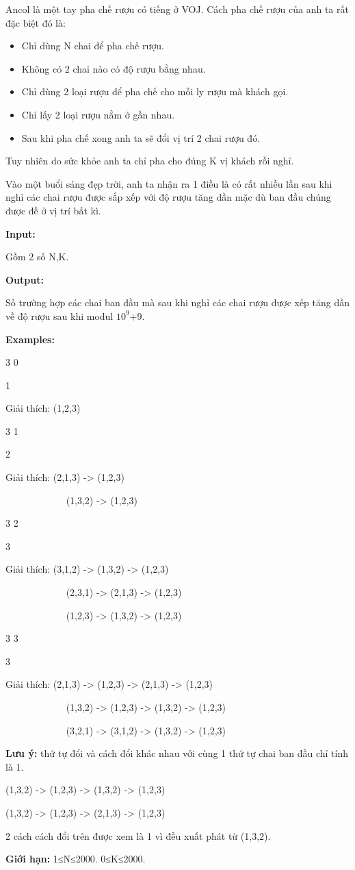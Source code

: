 

Ancol là một tay pha chế rượu có tiếng ở VOJ. Cách pha chế rượu của anh ta rất đặc biệt đó là:
\begin{itemize}
	\item Chỉ dùng N chai để pha chế rượu.
	\item Không có 2 chai nào có độ rượu bằng nhau.
	\item Chỉ dùng 2 loại rượu để pha chế cho mỗi ly rượu mà khách gọi.
	\item Chỉ lấy 2 loại rượu nằm ở gần nhau.
	\item Sau khi pha chế xong anh ta sẽ đổi vị trí 2 chai rượu đó.
\end{itemize}

Tuy nhiên do sức khỏe anh ta chỉ pha cho đúng K vị khách rồi nghỉ.

Vào một buổi sáng đẹp trời, anh ta nhận ra 1 điều là có rất nhiều lần sau khi nghỉ các chai rượu được sắp xếp với độ rượu tăng dần mặc dù ban đầu chúng được đề ở vị trí bất kì.

\textbf{Input:}

Gồm 2 số N,K.

\textbf{Output:}

Số trường hợp các chai ban đầu mà sau khi nghỉ các chai rượu được xếp tăng dần về độ rượu sau khi modul $10^{9}$+9.

\textbf{Examples:}

3 0       

1   

Giải thích: (1,2,3)

3 1 

2                  

Giải thích: (2,1,3) -> (1,2,3)

               (1,3,2) -> (1,2,3)

3 2                            

3

Giải thích: (3,1,2) -> (1,3,2) -> (1,2,3)

               (2,3,1) -> (2,1,3) -> (1,2,3)

               (1,2,3) -> (1,3,2) -> (1,2,3)

3 3    

3                

Giải thích: (2,1,3) -> (1,2,3) -> (2,1,3) -> (1,2,3)

               (1,3,2) -> (1,2,3) -> (1,3,2) -> (1,2,3)

               (3,2,1) -> (3,1,2) -> (1,3,2) -> (1,2,3)

\textbf{Lưu ý:} thứ tự đổi và cách đổi khác nhau với cùng 1 thứ tự chai ban đầu chỉ tính là 1.

(1,3,2) -> (1,2,3) -> (1,3,2) -> (1,2,3)

(1,3,2) -> (1,2,3) -> (2,1,3) -> (1,2,3)

2 cách cách đổi trên được xem là 1 vì đều xuất phát từ (1,3,2).

\textbf{Giới hạn:} 1≤N≤2000. 0≤K≤2000.

 

 
